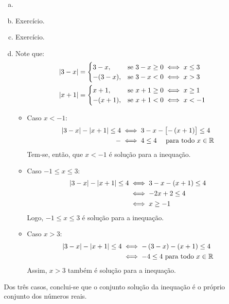\begin{solution}
\begin{enumerate}[(a)]
	\item[]
	\item Exercício.
	\item Exercício.
	\item Note que:
	\begin{align*}
		& \left|3-x\right|= 
		\begin{cases}
			3-x,    & \text{se } 3-x \ge 0 \iff x \le 3 \\
			-(3-x), & \text{se } 3-x < 0 \iff x > 3
		\end{cases}\\
		& \left|x+1\right|= 
		\begin{cases}
			x+1,    & \text{se } x+1 \ge 0 \iff x \ge 1 \\
			-(x+1), & \text{se } x+1 < 0 \iff x < -1
		\end{cases}
	\end{align*}

	\begin{itemize}
		\item Caso $x<-1$:
		\begin{align*}
			\modu{3-x}-\modu{x+1}\le4 & \iff 3-x-\left[-\prn{x+1}\right]\le 4\\
				-					  & \iff 4 \le 4 \ \ \ \ \text{para todo } x \in \R
		\end{align*}
		Tem-se, então, que $x<-1$ é solução para a inequação.
		\item Caso $-1 \le x \le 3$:
		\begin{align*}
		\left|3-x\right| - \left|x+1\right| \le 4 & \iff 3-x-\left(x+1\right) \le 4 \\
		& \iff -2x+2\le 4\\ 
		& \iff x \ge -1\\	
		\end{align*}
		Logo, $-1 \le x \le 3$ é solução para a inequação.
		\item Caso $x > 3$:
		\begin{align*}
		\left|3-x\right| - \left|x+1\right| \le 4 & \iff -\left(3-x\right)-\left(x+1\right) \le 4 \\
		& \iff -4\le 4 \text{ para todo }x \in \mathbb{R}
		\end{align*}
		Assim, $x>3$ também é solução para a inequação.
	\end{itemize}
\end{enumerate}
%
\noindent Dos três casos, conclui-se que o conjunto solução da inequação é o próprio conjunto dos números reais.
\end{solution}